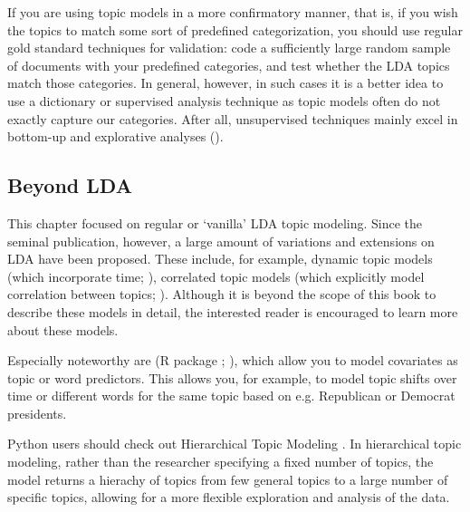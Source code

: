 If you are using topic models in a more confirmatory manner,
that is, if you wish the topics to match some sort of predefined categorization,
you should use regular gold standard techniques for validation:
code a sufficiently large random sample of documents with your predefined categories,
and test whether the LDA topics match those categories.
In general, however, in such cases it is a better idea to use a dictionary or supervised analysis technique
as topic models often do not exactly capture our categories. After all, unsupervised techniques mainly
excel in bottom-up and explorative analyses ().


\subsection{Beyond LDA}

This chapter focused on regular or `vanilla' LDA topic modeling.
Since the seminal publication, however, a large amount of variations and extensions on LDA have been proposed.
These include, for example, dynamic topic models (which incorporate time; \cite*{dynamiclda}),
correlated topic models (which explicitly model correlation between topics; \cite{correlatedlda}).
Although it is beyond the scope of this book to describe these models in detail,
the interested reader is encouraged to learn more about these models.

Especially noteworthy are  (R package ; \cite*{stm}),
which allow you to model covariates as topic or word predictors.
This allows you, for example, to model topic shifts over time or
different words for the same topic based on e.g. Republican or Democrat presidents. 

Python users should check out Hierarchical Topic Modeling \citep{hierarchicallda}.
In hierarchical topic modeling, rather than the researcher specifying a fixed number of topics,
the model returns a hierachy of topics from few general topics to a large number of specific topics,
allowing for a more flexible exploration and analysis of the data. 


